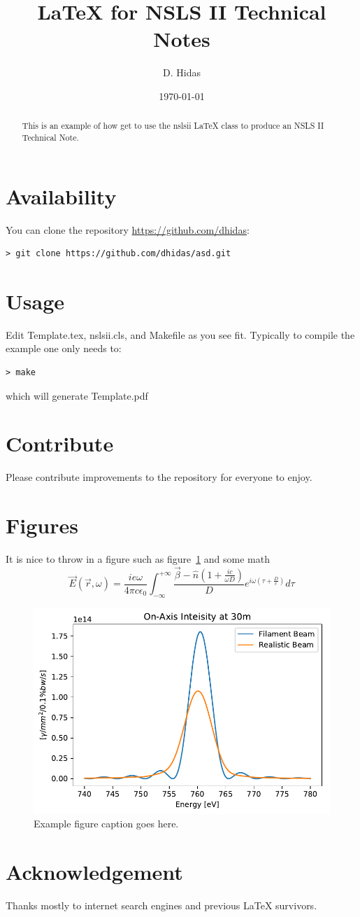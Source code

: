 \documentclass{nslsii}
\title{\LaTeX{}  for NSLS II Technical Notes}
\author{D. Hidas}
\date{\today}
\begin{document}
\maketitle

\begin{abstract}
This is an example of how get to use the nslsii \LaTeX{} class to produce an NSLS II Technical Note.
\end{abstract}


\section{Availability}
You can clone the repository \href{https://github.com/dhidas}{https://github.com/dhidas}:
\begin{verbatim}
> git clone https://github.com/dhidas/asd.git
\end{verbatim}

\section{Usage}
Edit Template.tex, nslsii.cls, and Makefile as you see fit.  Typically to compile the example one only needs to:
\begin{verbatim}
> make
\end{verbatim}
which will generate Template.pdf


\section{Contribute}
Please contribute improvements to the repository for everyone to enjoy.


\section{Figures}
It is nice to throw in a figure such as figure~\ref{fig:example} and some math
$$
\vec E(\vec r, \omega) = \frac{ie\omega}{4 \pi c \epsilon_0} \int_{-\infty}^{+\infty} \frac{\vec \beta - \hat n (1 + \frac{i c}{ \omega D})}{D} e^{i \omega ( \tau + \frac{D}{c} )} d\tau
$$

\begin{figure}
\centering
\includegraphics[width=0.5\columnwidth]{img/spectra}
\caption{Example figure caption goes here.}
\label{fig:example}
\end{figure}


\section*{Acknowledgement}
Thanks mostly to internet search engines and previous \LaTeX{} survivors.





\begin{thebibliography}{00}

\bibitem{}

\end{thebibliography}
\end{document}
